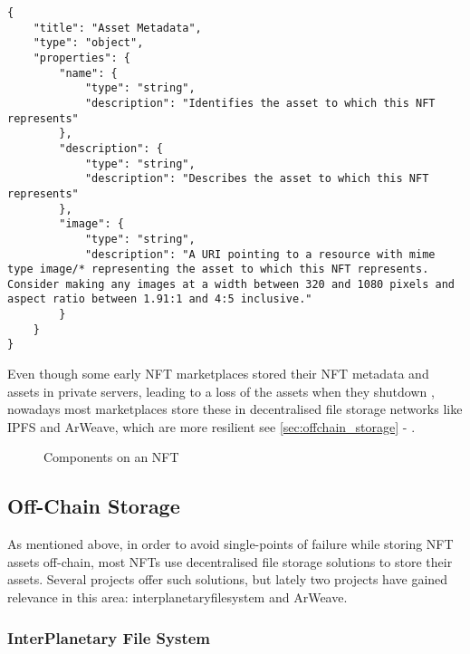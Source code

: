 \begin{lstlisting}[style=htmlCode,caption={ERC721 Metadata JSON Schema}] 
{
    "title": "Asset Metadata",
    "type": "object",
    "properties": {
        "name": {
            "type": "string",
            "description": "Identifies the asset to which this NFT represents"
        },
        "description": {
            "type": "string",
            "description": "Describes the asset to which this NFT represents"
        },
        "image": {
            "type": "string",
            "description": "A URI pointing to a resource with mime type image/* representing the asset to which this NFT represents. Consider making any images at a width between 320 and 1080 pixels and aspect ratio between 1.91:1 and 4:5 inclusive."
        }
    }
}
\end{lstlisting}

Even though some early NFT marketplaces stored their NFT metadata and assets in private servers, leading to a loss of the assets when they shutdown \cite{gallenHistoryNFTMarketplaces2023}, nowadays most marketplaces store these in decentralised file storage networks like IPFS and ArWeave, which are more resilient  see \autoref{sec:offchain_storage} - .


\begin{figure}[h]
    \centering
    
    \caption[Components on an NFT]{Components on an NFT}
    \label{fig:nftcomponents}
\end{figure}



\subsection{Off-Chain Storage}
\label{sec:offchain_storage}

As mentioned above, in order to avoid single-points of failure while storing NFT assets off-chain, most NFTs use decentralised file storage solutions to store their assets. Several projects offer such solutions, but lately two projects have gained relevance in this area: \gls{interplanetaryfilesystem} and ArWeave. 


\subsubsection{InterPlanetary File System}
\label{sec:ipfs}

